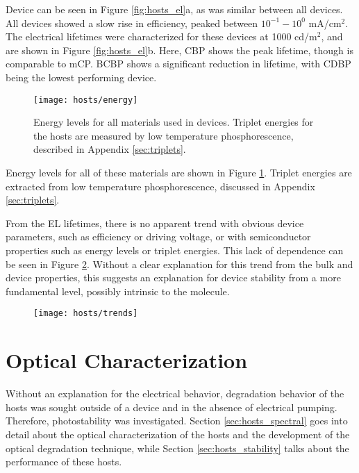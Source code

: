 \documentclass[../thesis.tex]{subfiles}
\begin{document}
Device \eqe can be seen in Figure \ref{fig:hosts_el}a, as was similar between all devices.  
All devices showed a slow rise in efficiency, peaked between $10^{-1}-10^0$ mA/cm$^2$.
The electrical lifetimes were characterized for these devices at 1000 cd/m$^2$, and are shown in Figure \ref{fig:hosts_el}b.
Here, CBP shows the peak lifetime, though is comparable to mCP.
BCBP shows a significant reduction in lifetime, with CDBP being the lowest performing device.


\begin{figure}[ht]
\centering
\texttt{[image: hosts/energy]}
\caption{Energy levels for all materials used in devices.  Triplet energies for the hosts are measured by low temperature phosphorescence, described in Appendix \ref{sec:triplets}.}
\label{fig:hosts_energy}
\end{figure}

Energy levels for all of these materials are shown in Figure \ref{fig:hosts_energy}.
Triplet energies are extracted from low temperature phosphorescence, discussed in Appendix \ref{sec:triplets}.

From the EL lifetimes, there is no apparent trend with obvious device parameters, such as efficiency or driving voltage, or with semiconductor properties such as energy levels or triplet energies.
This lack of dependence can be seen in Figure \ref{fig:hosts_trends}.
Without a clear explanation for this trend from the bulk and device properties, this suggests an explanation for device stability from a more fundamental level, possibly intrinsic to the molecule.

\begin{figure}[ht]
\centering
\texttt{[image: hosts/trends]}
\caption{}
\label{fig:hosts_trends}
\end{figure}


\section{Optical Characterization}

Without an explanation for the electrical behavior, degradation behavior of the hosts was sought outside of a device and in the absence of electrical pumping.
Therefore, photostability was investigated.
Section \ref{sec:hosts_spectral} goes into detail about the optical characterization of the hosts and the development of the optical degradation technique, while Section \ref{sec:hosts_stability} talks about the performance of these hosts.
\end{document}
